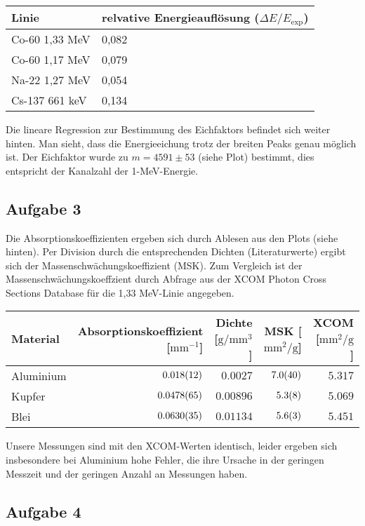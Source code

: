 \documentclass[a4paper,german,12pt,smallheadings]{scrartcl}
\begin{document}
\begin{tabular}{l|l}
  Linie & relvative Energieauflösung ($\Delta E/E_\text{exp}$) \\
  \hline
  Co-60 1{,}33 MeV & 0{,}082 \\
  Co-60 1{,}17 MeV & 0{,}079 \\
  Na-22 1{,}27 MeV & 0{,}054 \\
  Cs-137 661 keV & 0{,}134 \\
\end{tabular}
\vspace{22pt}

Die lineare Regression zur Bestimmung des Eichfaktors befindet sich weiter
hinten. Man sieht, dass die Energieeichung trotz der breiten Peaks genau
möglich ist. Der Eichfaktor wurde zu $m = 4591\pm53$ (siehe Plot) bestimmt,
dies entspricht der Kanalzahl der 1-MeV-Energie.

\subsection{Aufgabe 3}

Die Absorptionskoeffizienten ergeben sich durch Ablesen aus den Plots (siehe
hinten). Per Division durch die entsprechenden Dichten (Literaturwerte) ergibt
sich der Massenschwächungskoeffizient (MSK). Zum Vergleich ist der
Massenschwächungskoeffzient durch Abfrage aus der XCOM Photon Cross Sections
Database für die 1{,}33 MeV-Linie angegeben.

\begin{tabular}{l|r|r|r|r}
  Material & Absorptionskoeffizient [$\text{mm}^{-1}$] & Dichte [$\text{g}/\text{mm}^3$]& MSK [$\text{mm}^2/\text{g}$] & XCOM [$\text{mm}^2/\text{g}$] \\
  \hline
  Aluminium & $\num{0.018+-0.012}$ & $\num{0.0027}$ & $\num{7.0+-4.0}$ & $\num{5.317}$\\
  Kupfer & $\num{0.0478+-0.0065}$ & $\num{0.00896}$ & $\num{5.3+-0.8}$ & $\num{5.069}$\\
  Blei & $\num{0.0630+-0.0035}$ & $\num{0.01134}$ & $\num{5.6+-0.3}$   & $\num{5.451}$\\
\end{tabular}
\vspace{22pt}

Unsere Messungen sind mit den XCOM-Werten identisch, leider ergeben sich
insbesondere bei Aluminium hohe Fehler, die ihre Ursache in der geringen
Messzeit und der geringen Anzahl an Messungen haben.

\subsection{Aufgabe 4}
\end{document}
